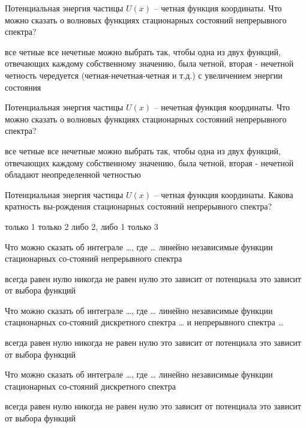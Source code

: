 \documentclass[11pt,a4paper]{exam}
\begin{document}
\begin{questions}
\question Потенциальная энергия частицы $U(x)$ – четная функция координаты. Что можно сказать о волновых функциях стационарных состояний непрерывного спектра?
\begin{choices}
\choice все четные  
\choice все нечетные
\choice можно выбрать так, чтобы одна из двух функций, отвечающих каждому собственному значению, была четной, вторая - нечетной
\choice четность чередуется (четная-нечетная-четная и т.д.) с увеличением энергии состояния
\end{choices}

\question Потенциальная энергия частицы $U(x)$ – нечетная функция координаты. Что можно сказать о волновых функциях стационарных состояний непрерывного спектра?
\begin{choices}
\choice все четные  
\choice все нечетные
\choice можно выбрать так, чтобы одна из двух функций, отвечающих каждому собственному значению, была четной, вторая - нечетной
\choice обладают неопределенной четностью
\end{choices}

\question Потенциальная энергия частицы $U(x)$ – четная функция координаты. Какова кратность вы-рождения стационарных состояний непрерывного спектра?
\begin{choices}
\choice только 1
\choice только 2
\choice либо 2, либо 1
\choice только 3
\end{choices}

\question Что можно сказать об интеграле …, где … линейно независимые функции стационарных со-стояний непрерывного спектра
\begin{choices}
\choice всегда равен нулю
\choice никогда не равен нулю
\choice это зависит от потенциала
\choice это зависит от выбора функций
\end{choices}

\question Что можно сказать об интеграле …, где … линейно независимые функции стационарных со-стояний дискретного спектра … и непрерывного спектра …
\begin{choices}
\choice всегда равен нулю
\choice никогда не равен нулю
\choice это зависит от потенциала
\choice это зависит от выбора функций
\end{choices}

\question Что можно сказать об интеграле …, где … линейно независимые функции стационарных со-стояний дискретного спектра
\begin{choices}
\choice всегда равен нулю
\choice никогда не равен нулю
\choice это зависит от потенциала
\choice это зависит от выбора функций
\end{choices}


\end{questions}
\end{document}
